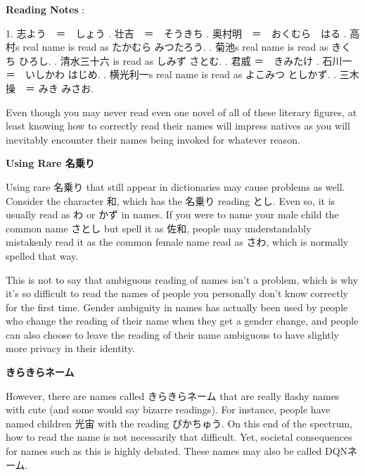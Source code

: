 \par{\textbf{Reading Notes }: }

\par{1. 志よう　＝　しょう \hfill{}. 壮吉　＝　そうきち \hfill{}. 奥村明　＝　おくむら　はる \hfill{}. 高村\textquotesingle s real name is read as たかむら みつたろう. \hfill{}. 菊池\textquotesingle s real name is read as きくち ひろし. \hfill{}. 清水三十六 is read as しみず さとむ. \hfill{}. 君威 ＝　きみたけ \hfill{}. 石川一　＝　いしかわ はじめ. \hfill{}. 横光利一\textquotesingle s real name is read as よこみつ としかず. \hfill{}. 三木操　＝ みき みさお. }

\par{ Even though you may never read even one novel of all of these literary figures, at least knowing how to correctly read their names will impress natives as you will inevitably encounter their names being invoked for whatever reason. }

\begin{center}
 \textbf{Using Rare 名乗り }
\end{center}

\par{ Using rare 名乗り that still appear in dictionaries may cause problems as well. Consider the character 和, which has the 名乗り reading とし. Even so, it is usually read as わ or かず in names. If you were to name your male child the common name さとし but spell it as 佐和, people may understandably mistakenly read it as the common female name read as さわ, which is normally spelled that way. }

\par{ This is not to say that ambiguous reading of names isn't a problem, which is why it's so difficult to read the names of people you personally don't know correctly for the first time. Gender ambiguity in names has actually been used by people who change the reading of their name when they get a gender change, and people can also choose to leave the reading of their name ambiguous to have slightly more privacy in their identity. }

\begin{center}
\textbf{きらきらネーム } 
\end{center}

\par{ However, there are names called きらきらネーム that are really flashy names with cute (and some would say bizarre readings). For instance, people have named children 光宙 with the reading ぴかちゅう. On this end of the spectrum, how to read the name is not necessarily that difficult. Yet, societal consequences for names such as this is highly debated. These names may also be called DQNネーム. }

